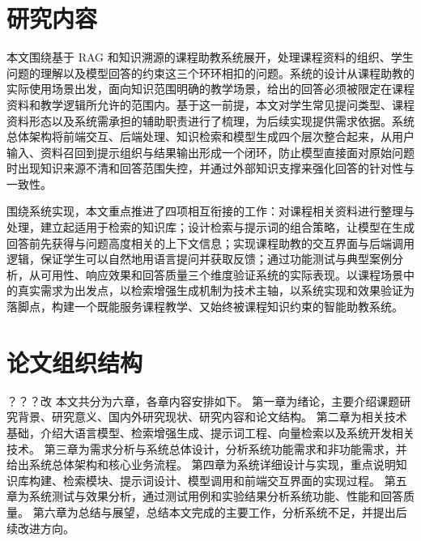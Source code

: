 \section{研究内容}
本文围绕基于 RAG 和知识溯源的课程助教系统展开，处理课程资料的组织、学生问题的理解以及模型回答的约束这三个环环相扣的问题。系统的设计从课程助教的实际使用场景出发，面向知识范围明确的教学场景，给出的回答必须被限定在课程资料和教学逻辑所允许的范围内。基于这一前提，本文对学生常见提问类型、课程资料形态以及系统需承担的辅助职责进行了梳理，为后续实现提供需求依据。系统总体架构将前端交互、后端处理、知识检索和模型生成四个层次整合起来，从用户输入、资料召回到提示组织与结果输出形成一个闭环，防止模型直接面对原始问题时出现知识来源不清和回答范围失控，并通过外部知识支撑来强化回答的针对性与一致性。

围绕系统实现，本文重点推进了四项相互衔接的工作：对课程相关资料进行整理与处理，建立起适用于检索的知识库；设计检索与提示词的组合策略，让模型在生成回答前先获得与问题高度相关的上下文信息；实现课程助教的交互界面与后端调用逻辑，保证学生可以自然地用语言提问并获取反馈；通过功能测试与典型案例分析，从可用性、响应效果和回答质量三个维度验证系统的实际表现。以课程场景中的真实需求为出发点，以检索增强生成机制为技术主轴，以系统实现和效果验证为落脚点，构建一个既能服务课程教学、又始终被课程知识约束的智能助教系统。


\section{论文组织结构}
？？？改
本文共分为六章，各章内容安排如下。
第一章为绪论，主要介绍课题研究背景、研究意义、国内外研究现状、研究内容和论文结构。
第二章为相关技术基础，介绍大语言模型、检索增强生成、提示词工程、向量检索以及系统开发相关技术。
第三章为需求分析与系统总体设计，分析系统功能需求和非功能需求，并给出系统总体架构和核心业务流程。
第四章为系统详细设计与实现，重点说明知识库构建、检索模块、提示词设计、模型调用和前端交互界面的实现过程。
第五章为系统测试与效果分析，通过测试用例和实验结果分析系统功能、性能和回答质量。
第六章为总结与展望，总结本文完成的主要工作，分析系统不足，并提出后续改进方向。